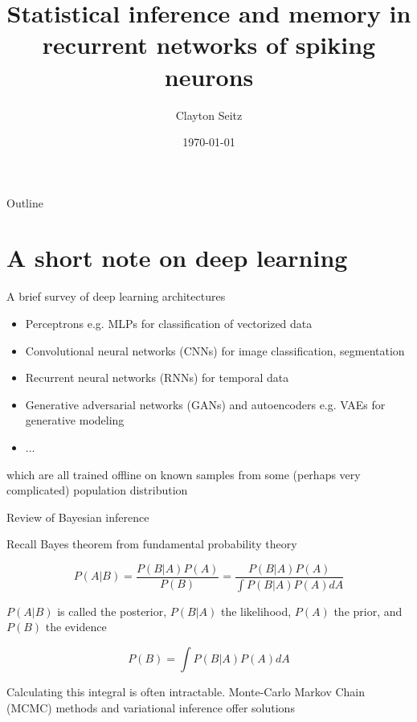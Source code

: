 \documentclass[aspectratio=169]{beamer}
\begin{document}
\title{Statistical inference and memory in recurrent networks of spiking neurons}  
\author{Clayton Seitz}
\date{\today} 

\maketitle


\begin{frame}{Outline}
\tableofcontents
\end{frame}

\section{A short note on deep learning}

\begin{frame}{A brief survey of deep learning architectures}

\begin{itemize}
\item Perceptrons e.g. MLPs for classification of vectorized data
\item Convolutional neural networks (CNNs) for image classification, segmentation
\item Recurrent neural networks (RNNs) for temporal data
\item Generative adversarial networks (GANs) and autoencoders e.g. VAEs for generative modeling
\item ...
\end{itemize}

\vfill
{\color{red} which are all trained offline on known samples from some (perhaps very complicated) population distribution}

\end{frame}

\begin{frame}{Review of Bayesian inference}

Recall Bayes theorem from fundamental probability theory

\begin{equation*}
P(A|B) = \frac{P(B|A)P(A)}{P(B)} = \frac{P(B|A)P(A)}{\int P(B|A)P(A)dA}
\end{equation*}
\vfill

$P(A|B)$ is called the posterior, $P(B|A)$ the likelihood, $P(A)$ the prior, and $P(B)$ the evidence
\vfill

\begin{equation*}
P(B) = \int P(B|A)P(A)dA
\end{equation*}

Calculating this integral is often intractable. Monte-Carlo Markov Chain (MCMC) methods and variational inference offer solutions

\end{frame}
\end{document}
